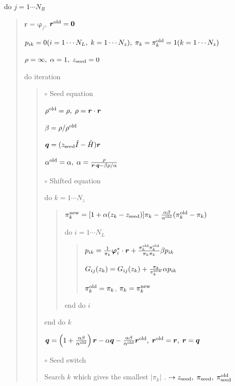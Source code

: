 \documentclass[letterpaper,10pt,dvipdfmx,openany]{sphinxmanual}
\begin{document}
do \(j = 1 \cdots N_R\)
\begin{quote}

\({\boldsymbol r} = {\boldsymbol \varphi_j}\), \({\boldsymbol r}^{\rm old} = {\bf 0}\)

\(p_{i k} = 0(i=1 \cdots N_L,\; k=1 \cdots N_z),\; \pi_k=\pi_k^{\rm old} = 1(k=1 \cdots N_z)\)

\(\rho = \infty,\; \alpha = 1,\; z_{\rm seed}=0\)

do iteration
\begin{quote}

\(\circ\) Seed equation

\(\rho^{\rm old} = \rho,\; \rho = {\boldsymbol r} \cdot {\boldsymbol r}\)

\(\beta = \rho / \rho^{\rm old}\)

\({\boldsymbol q} = (z_{\rm seed} {\hat I} - {\hat H}){\boldsymbol r}\)

\(\alpha^{\rm old} = \alpha,\; \alpha = \frac{\rho}{{\boldsymbol r}\cdot{\boldsymbol q} - \beta \rho / \alpha }\)

\(\circ\) Shifted equation

do \(k = 1 \cdots N_z\)
\begin{quote}

\(\pi_k^{\rm new} = [1+\alpha(z_k-z_{\rm seed})]\pi_k - \frac{\alpha \beta}{\alpha^{\rm old}}(\pi_k^{\rm old} - \pi_k)\)

do \(i = 1 \cdots N_L\)
\begin{quote}

\(p_{i k} = \frac{1}{\pi_k} {\boldsymbol \varphi}_i^* \cdot {\boldsymbol r} + \frac{\pi^{\rm old}_k \pi^{\rm old}_k}{\pi_k \pi_k} \beta p_{i k}\)

\(G_{i j}(z_k) = G_{i j}(z_k) + \frac{\pi_k}{\pi_k^{\rm new}} \alpha p_{i k}\)

\(\pi_k^{\rm old} = \pi_k\), \(\pi_k = \pi_k^{\rm new}\)
\end{quote}

end do \(i\)
\end{quote}

end do \(k\)

\({\boldsymbol q} = \left( 1 + \frac{\alpha \beta}{\alpha^{\rm old}} \right) {\boldsymbol r} - \alpha {\boldsymbol q} - \frac{\alpha \beta}{\alpha^{\rm old}} {\boldsymbol r}^{\rm old},\; {\boldsymbol r}^{\rm old} = {\boldsymbol r},\; {\boldsymbol r} = {\boldsymbol q}\)

\(\circ\) Seed switch

Search \(k\) which gives the smallest \(|\pi_k|\) . \(\rightarrow z_{\rm seed},\; \pi_{\rm seed},\; \pi_{\rm seed}^{\rm old}\)


\end{quote}
\end{quote}
\end{document}
